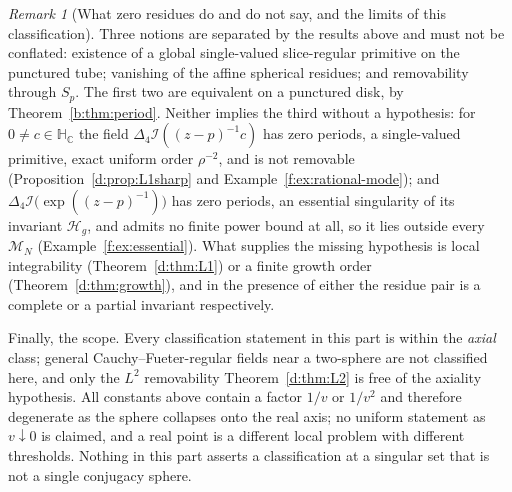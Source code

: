 \documentclass[11pt,a4paper]{article}
\numberwithin{equation}{section}
\theoremstyle{definition}
\theoremstyle{remark}
\newtheorem{remark}[theorem]{Remark}
\theoremstyle{plain}
\newcommand{\HC}{\mathbb H_{\mathbb C}}
\newcommand{\lap}{\Delta_4}
\newcommand{\I}{\mathcal I}
\newcommand{\thet}{\theta}
\newcommand{\Sp}{S_{p}}
\newcommand{\Rp}{\mathcal R_{p}}      %
\newcommand{\Hg}{\mathcal H_{g}}      %
\newcommand{\Msph}{M^{\mathrm{sph}}}                  %
\newcommand{\Max}{M^{\mathrm{ax}}}                    %
\begin{document}
\begin{remark}[What zero residues do and do not say, and the limits of
this classification]
\label{d:rem:scope-VII}
Three notions are separated by the results above and must not be conflated:
existence of a global single-valued slice-regular primitive on the
punctured tube; vanishing of the affine spherical residues; and
removability through $\Sp$.  The first two are equivalent on a punctured
disk, by Theorem~\ref{b:thm:period}.  Neither implies the third without a hypothesis: for
$0\ne c\in\HC$ the field $\lap\I((z-p)^{-1}c)$ has zero periods, a
single-valued primitive, exact uniform order $\rho^{-2}$, and is not
removable (Proposition~\ref{d:prop:L1sharp} and
Example~\ref{f:ex:rational-mode}); and
$\lap\I\bigl(\exp((z-p)^{-1})\bigr)$ has zero periods, an essential
singularity of its invariant $\Hg$, and admits no finite power bound at
all, so it lies outside every $\mathcal M_N$
(Example~\ref{f:ex:essential}).  What supplies the missing
hypothesis is local integrability (Theorem~\ref{d:thm:L1}) or a finite
growth order (Theorem~\ref{d:thm:growth}), and in the presence of either
the residue pair is a complete or a partial invariant respectively.

Finally, the scope.  Every classification statement in this part is within
the \emph{axial} class; general Cauchy--Fueter-regular fields near a
two-sphere are not classified here, and only the $L^2$ removability
Theorem~\ref{d:thm:L2} is free of the axiality hypothesis.  All constants
above contain a factor $1/v$ or $1/v^2$ and therefore degenerate as the
sphere collapses onto the real axis; no uniform statement as $v\downarrow0$
is claimed, and a real point is a different local problem with different
thresholds.  Nothing in this part asserts a classification at a singular
set that is not a single conjugacy sphere.
\end{remark}


\end{document}
